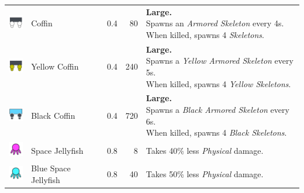 \begin{table}[H]
\begin{tabular}{m{9mm}m{25mm}D{.}{.}{-1}rm{0.48\textwidth}}
        \includegraphics[height=7mm]{img/Icons/Attackers/Coffin.png}                  & \footnotesize{Coffin}                  & 0.4                 & 80               & \footnotesize{\textbf{Large.} \newline Spawns an \emph{Armored Skeleton} every 4s. \newline When killed, spawns 4 \emph{Skeletons}.}                \\
        \includegraphics[height=7mm]{img/Icons/Attackers/Yellow Coffin.png}           & \footnotesize{Yellow Coffin}           & 0.4                 & 240              & \footnotesize{\textbf{Large.} \newline Spawns a \emph{Yellow Armored Skeleton} every 5s. \newline When killed, spawns 4 \emph{Yellow Skeletons}.}   \\
        \includegraphics[height=7mm]{img/Icons/Attackers/Black Coffin.png}            & \footnotesize{Black Coffin}            & 0.4                 & 720              & \footnotesize{\textbf{Large.} \newline Spawns a \emph{Black Armored Skeleton} every 6s. \newline When killed, spawns 4 \emph{Black Skeletons}.}     \\
        \includegraphics[height=7mm]{img/Icons/Attackers/Jellyfish.png}               & \footnotesize{Space Jellyfish}         & 0.8                 & 8                & \footnotesize{Takes 40\% less \emph{Physical} damage.}                                                                                              \\
        \includegraphics[height=7mm]{img/Icons/Attackers/Blue Jellyfish.png}          & \footnotesize{Blue Space Jellyfish}    & 0.8                 & 40               & \footnotesize{Takes 50\% less \emph{Physical} damage.}                                                                                              \\

\end{tabular}
\end{table}
